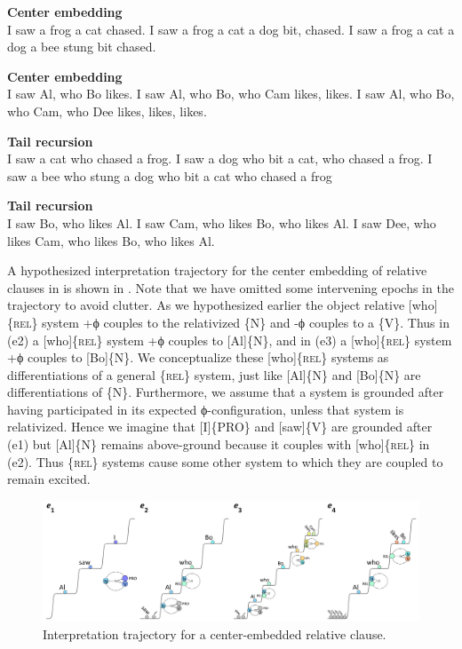 \ea\label{ex:6:15}
\textbf{Center embedding}\\
    \ea I saw a frog a cat chased.                      
    \ex I saw a frog a cat a dog bit, chased.  
    \ex I saw a frog a cat a dog a bee stung bit chased.
    \z
\z

\ea\label{ex:6:16}
\textbf{Center embedding}\\
    \ea\label{ex:6:16a} I saw Al, who Bo likes.                                
    \ex\label{ex:6:16b} I saw Al, who Bo, who Cam likes, likes.                
    \ex\label{ex:6:16c} I saw Al, who Bo, who Cam, who Dee likes, likes, likes.
    \z
\z

\ea\label{ex:6:17}
\textbf{Tail recursion}\\
    \ea I saw a cat who chased a frog.
    \ex I saw a dog who bit a cat, who chased a frog.
    \ex I saw a bee who stung a dog who bit a cat who chased a frog
    \z
\z

\ea\label{ex:6:18}
\textbf{Tail recursion}\\
    \ea I saw Bo, who likes Al.
    \ex\label{ex:6:18b} I saw Cam, who likes Bo, who likes Al.
    \ex\label{ex:6:18c} I saw Dee, who likes Cam, who likes Bo, who likes Al.
    \z
\z
  

  A hypothesized interpretation trajectory for the center embedding of relative clauses in  is shown in {}. Note that we have omitted some intervening epochs in the trajectory to avoid clutter. As we hypothesized earlier the object relative [who]\{\textsc{rel}\} system +ϕ couples to the relativized \{N\} and -ϕ couples to a \{V\}. Thus in (e2) a [who]\{\textsc{rel}\} system +ϕ couples to [Al]\{N\}, and in (e3) a [who]\{\textsc{rel}\} system +ϕ couples to [Bo]\{N\}. We conceptualize these [who]\{\textsc{rel}\} systems as differentiations of a general \{\textsc{rel}\} system, just like [Al]\{N\} and [Bo]\{N\} are differentiations of \{N\}. Furthermore, we assume that a system is grounded after having participated in its expected ϕ-configuration, unless that system is relativized. Hence we imagine that [I]\{\textsc{PRO}\} and [saw]\{V\} are grounded after (e1) but [Al]\{N\} remains above-ground because it couples with [who]\{\textsc{rel}\} in (e2). Thus \{\textsc{rel}\} systems cause some other system to which they are coupled to remain excited.

  
\begin{figure}
\includegraphics[width=\textwidth]{figures/Tilsen-img132.png}
\caption{Interpretation trajectory for a center-embedded relative clause.}
\label{fig:6:13}
\end{figure}
 

